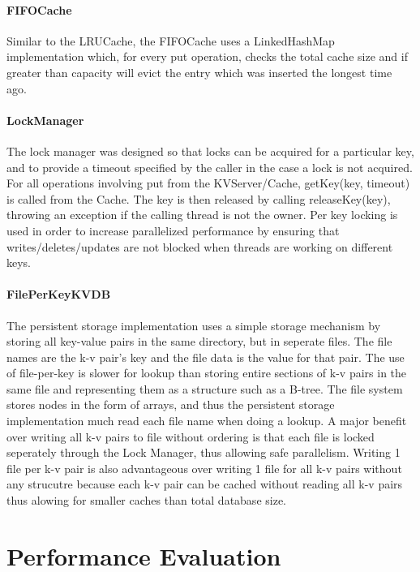 \documentclass[10pt]{article}
\begin{document}
\begin{multicols}{2}
\paragraph{FIFOCache} Similar to the LRUCache, the FIFOCache uses a LinkedHashMap implementation which, for every put operation, checks the total cache size and if greater than capacity will evict the entry which was inserted the longest time ago.

\paragraph{LockManager} The lock manager was designed so that locks can be acquired for a particular key, and to provide a timeout specified by the caller in the case a lock is not acquired. For all operations involving put from the KVServer/Cache, getKey(key, timeout) is called from the Cache. The key is then released by calling releaseKey(key), throwing an exception if the calling thread is not the owner. Per key locking is used in order to increase parallelized performance by ensuring that writes/deletes/updates are not blocked when threads are working on different keys.

\paragraph{FilePerKeyKVDB} The persistent storage implementation uses a simple storage mechanism by storing all key-value pairs in the same directory, but in seperate files. The file names are the k-v pair’s key and the file data is the value for that pair. The use of file-per-key is slower for lookup than storing entire sections of k-v pairs in the same file and representing them as a structure such as a B-tree. The file system stores nodes in the form of arrays, and thus the persistent storage implementation much read each file name when doing a lookup. A major benefit over writing all k-v pairs to file without ordering is that each file is locked seperately through the Lock Manager, thus allowing safe parallelism. Writing 1 file per k-v pair is also advantageous over writing 1 file for all k-v pairs without any strucutre because each k-v pair can be cached without reading all k-v pairs thus alowing for smaller caches than total database size.

\section{Performance Evaluation}



\end{multicols}
\end{document}
